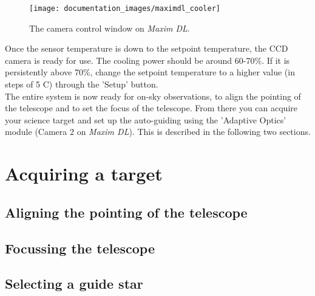 \documentclass[12pt,twoside,a4paper]{report}
\begin{document}
\begin{figure}[ht]
 \centering
    \texttt{[image: documentation\_images/maximdl\_cooler]}
    \caption{\label{fig:coolers} The camera control window on \emph{Maxim DL}.}
\end{figure}

Once the sensor temperature is down to the setpoint temperature, the CCD camera is ready for use. 
The cooling power should be around 60-70\%. If it is persistently above 70\%, change the setpoint 
temperature to a higher value (in steps of 5 C) through the 'Setup' button.\\

The entire system is now ready for on-sky observations, to align the pointing of the telescope and
to set the focus of the telescope. From there you can acquire your science target and set up the 
auto-guiding using the 'Adaptive Optics' module (Camera 2 on \emph{Maxim DL}). This is described
in the following two sections.



\section{Acquiring a target}
\label{acquire}


\subsection{Aligning the pointing of the telescope}

\subsection{Focussing the telescope}

\subsection{Selecting a guide star}
\end{document}
